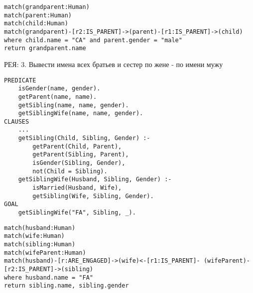 \begin{lstlisting}[caption=Neo4j: Вывести имена предков родителей по отцовской линии]
match(grandparent:Human) 
match(parent:Human) 
match(child:Human)
match(grandparent)-[r2:IS_PARENT]->(parent)-[r1:IS_PARENT]->(child)
where child.name = "CA" and parent.gender = "male"
return grandparent.name
\end{lstlisting}

\clearpage

РЕЯ: 3. Вывести имена всех братьев и сестер по жене - по имени мужу

\begin{lstlisting}[caption=Prolog: Вывести имена всех братьев и сестер по жене ]
PREDICATE
	isGender(name, gender).
	getParent(name, name).
	getSibling(name, name, gender).
	getSiblingWife(name, name, gender).
CLAUSES
	...
	getSibling(Child, Sibling, Gender) :- 
		getParent(Child, Parent),
		getParent(Sibling, Parent),
		isGender(Sibling, Gender),
		not(Child = Sibling).
	getSiblingWife(Husband, Sibling, Gender) :-
		isMarried(Husband, Wife),
		getSibling(Wife, Sibling, Gender).
GOAL
	getSiblingWife("FA", Sibling, _).	
\end{lstlisting}

\begin{lstlisting}[caption=Neo4j: Вывести имена всех братьев и сестер по жене ]
match(husband:Human) 
match(wife:Human)
match(sibling:Human)
match(wifeParent:Human)
match(husband)-[r:ARE_ENGAGED]->(wife)<-[r1:IS_PARENT]- (wifeParent)-[r2:IS_PARENT]->(sibling)
where husband.name = "FA"
return sibling.name, sibling.gender
\end{lstlisting}